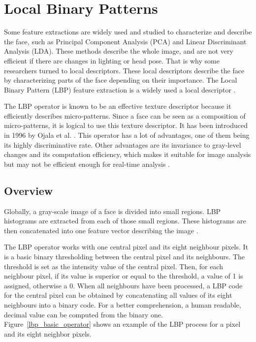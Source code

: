 \chapter{Local Binary Patterns}
\label{chap:lbp}

\noindent Some feature extractions are widely used and studied to characterize and describe the face, such as Principal Component Analysis (PCA) and Linear Discriminant Analysis (LDA). These methods describe the whole image, and are not very efficient if there are changes in lighting or head pose. That is why some researchers turned to local descriptors. These local descriptors describe the face by characterizing parts of the face depending on their importance. The Local Binary Pattern (LBP) feature extraction is a widely used a local descriptor \cite{AHO06}.
\newline

\noindent The LBP operator is known to be an effective texture descriptor because it efficiently describes micro-patterns. Since a face can be seen as a composition of micro-patterns, it is logical to use this texture descriptor. It has been introduced in 1996 by Ojala et al. \cite{OJA96}. This operator has a lot of advantages, one of them being its highly discriminative rate. Other advantages are its invariance to gray-level changes and its computation efficiency, which makes it suitable for image analysis but may not be efficient enough for real-time analysis \cite{AHO06}.
\newline

\section{Overview}

\vspace{\baselineskip}
\noindent Globally, a gray-scale image of a face is divided into small regions. LBP histograms are extracted from each of those small regions. These histograms are then concatenated into one feature vector describing the image \cite{JUL07}.
\newline

\noindent The LBP operator works with one central pixel and its eight neighbour pixels. It is a basic binary thresholding between the central pixel and its neighbours. The threshold is set as the intensity value of the central pixel. Then, for each neighbour pixel, if its value is superior or equal to the threshold, a value of 1 is assigned, otherwise a 0. When all neighbours have been processed, a LBP code for the central pixel can be obtained by concatenating all values of its eight neighbours into a binary code. For a better comprehension, a human readable, decimal value can be computed from the binary one. Figure~\ref{lbp_basic_operator} shows an example of the LBP process for a pixel and its eight neighbor pixels.
\newline


